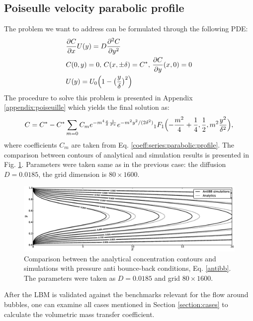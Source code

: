 \documentclass{article}
\newcommand{\beq}{\begin{equation}}
\newcommand{\feq}{\end{equation}}
\newcommand{\cstar}{C^{*}}
\begin{document}
\subsection{Poiseulle velocity parabolic profile}
The problem we want to address can be formulated through the following PDE:
\beq
\begin{aligned}
&\frac{\partial C}{\partial x} U(y)=D\frac{\partial^2 C}{\partial y^2}\\
&C(0,y)=0,\, C(x,\pm \delta)=\cstar,\, \frac{\partial C}{\partial y }(x,0)=0\\
&U(y)=U_0 \Bigl(1-\bigl(\frac{y}{\delta}\bigr)^2\Bigr)
\end{aligned}
\feq
The procedure to solve this problem is presented in Appendix \ref{appendix:poiseuille} which yields
the final solution as:
\begin{equation}
C=\cstar-\cstar \sum_{m=0}{C_m e^{-m^4 \frac{x}{\delta}\frac{1}{Pe}} e^{-m^2
y^2/(2\delta^2)}{_1F_1}\Bigl(-\frac{m^2}{4}+\frac{1}{4},\frac{1}{2},m^2 \frac{y^2}{\delta^2}\Bigr)},
\end{equation}
where coefficients $C_m$ are taken from Eq. \ref{coeff:series:parabolic:profile}. The comparison
between contours of analytical and simulation results is presented in Fig.
\ref{fig:parabolic:comparison}. Parameters were taken  same as in the previous case: the
diffusion $D=0.0185$, the grid dimension is $80\times1600$. 
\begin{figure}[htb!]
\includegraphics[width=\textwidth]{Figures/parabolic_profile_comparison.eps}
\caption{Comparison between the analytical concentration contours and simulations with pressure
anti bounce-back conditions, Eq. \ref{antibb}. The parameters were
taken as $D=0.0185$ and grid $80\times1600$. \label{fig:parabolic:comparison}}
\end{figure}

After the LBM is validated against the benchmarks relevant for the flow around bubbles, one can
examine all cases mentioned in Section
\ref{section:cases} to calculate the volumetric mass transfer coefficient.
\end{document}
